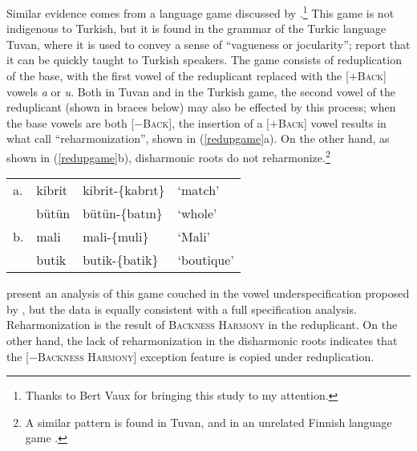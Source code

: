 Similar evidence comes from a language game discussed by \citet{Harrison2001}.\footnote{Thanks to Bert Vaux for bringing this study to my attention.} This game is not indigenous to Turkish, but it is found in the grammar of the Turkic language Tuvan, where it is used to convey a sense of ``vagueness or jocularity''; \citeauthor{Harrison2001} report that it can be quickly taught to Turkish speakers. The game consists of reduplication of the base, with the first vowel of the reduplicant replaced with the [$+$\textsc{Back}] vowels \emph{a} or \emph{u}. Both in Tuvan and in the Turkish game, the second vowel of the reduplicant (shown in braces below) may also be effected by this process; when the base vowels are both [$-$\textsc{Back}], the insertion of a [$+$\textsc{Back}] vowel results in what \citeauthor{Harrison2001} call ``reharmonization'', shown in  (\ref{redupgame}a). On the other hand, as shown in (\ref{redupgame}b), disharmonic roots do not reharmonize.\footnote{A similar pattern is found in Tuvan, and in an unrelated Finnish language game \citep{Campbell1986}.}

\begin{example} \label{redupgame}
\begin{tabular}{l l l l}
a. & {kibrit} & {kibrit}-\{{kabrıt}\} & `match'    \\
   & {bütün}  & {bütün}-\{{batın}\}   & `whole'    \\
b. & {mali}   & {mali}-\{{muli}\}     & `Mali'     \\
   & {butik}  & {butik}-\{{batik}\}   & `boutique' \\
\end{tabular}
\end{example}

\noindent 
\citeauthor{Harrison2001} present an analysis of this game couched in the vowel underspecification proposed by \citeauthor{Clements1982}, but the data is equally consistent with a full specification analysis. Reharmonization is the result of \textsc{Backness Harmony} in the reduplicant. On the other hand, the lack of reharmonization in the disharmonic roots indicates that the [$-$\textsc{Backness Harmony}] exception feature is copied under reduplication. 

